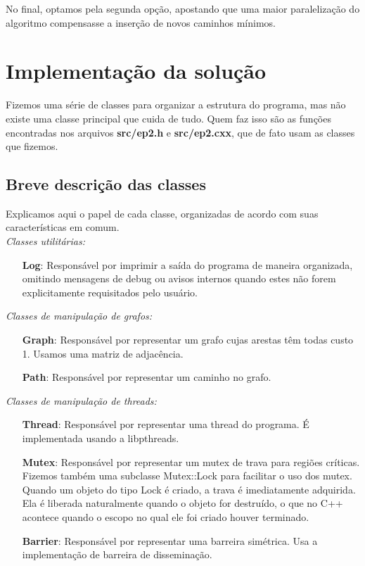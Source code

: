 \documentclass[a4paper,11pt]{article}
\begin{document}
    No final, optamos pela segunda opção, apostando que uma maior paralelização
    do algoritmo compensasse a inserção de novos caminhos mínimos.

\section{Implementação da solução}
  Fizemos uma série de classes para organizar a estrutura do programa, mas não
  existe uma classe principal que cuida de tudo. Quem faz isso são as funções
  encontradas nos arquivos \textbf{src/ep2.h} e \textbf{src/ep2.cxx}, que de
  fato usam as classes que fizemos.

  \subsection{Breve descrição das classes}
    Explicamos aqui o papel de cada classe, organizadas de acordo com suas
    características em comum. \\

    \textit{Classes utilitárias:}
    \begin{itemize}
      \item[\textbf{Log}:]
        Responsável por imprimir a saída do programa de maneira organizada,
        omitindo mensagens de debug ou avisos internos quando estes não forem
        explicitamente requisitados pelo usuário.
    \end{itemize}

    \textit{Classes de manipulação de grafos:}
    \begin{itemize}
      \item[\textbf{Graph}:]
        Responsável por representar um grafo cujas arestas têm todas custo 1.
        Usamos uma matriz de adjacência.
      \item[\textbf{Path}:]
        Responsável por representar um caminho no grafo.
    \end{itemize}

    \textit{Classes de manipulação de threads:}
    \begin{itemize}
      \item[\textbf{Thread}:]
        Responsável por representar uma thread do programa. É implementada
        usando a libpthreads.
      \item[\textbf{Mutex}:]
        Responsável por representar um mutex de trava para regiões críticas.
        Fizemos também uma subclasse Mutex::Lock para facilitar o uso dos mutex.
        Quando um objeto do tipo Lock é criado, a trava é imediatamente
        adquirida. Ela é liberada naturalmente quando o objeto for destruído,
        o que no C++ acontece quando o escopo no qual ele foi criado houver
        terminado.
      \item[\textbf{Barrier}:]
        Responsável por representar uma barreira simétrica. Usa a implementação
        de barreira de disseminação.
    \end{itemize}
\end{document}
